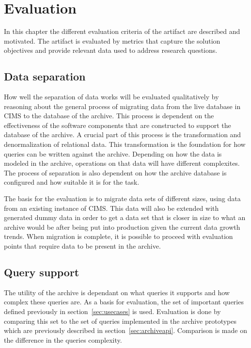 \chapter{Evaluation}
\label{chap:eval}

In this chapter the different evaluation criteria of the artifact are described and motivated. The artifact is evaluated by metrics that capture the solution objectives and provide relevant data used to address research questions.

\section{Data separation}
How well the separation of data works will be evaluated qualitatively by reasoning about the general process of migrating data from the live database in CIMS to the database of the archive. This process is dependent on the effectiveness of the software components that are constructed to support the database of the archive.
A crucial part of this process is the transformation and denormalization of relational data. This transformation is the foundation for how queries can be written against the archive. Depending on how the data is modeled in the archive, operations on that data will have different complexites. The process of separation is also dependent on how the archive database is configured and how suitable it is for the task. 

The basis for the evaluation is to migrate data sets of different sizes, using data from an existing instance of CIMS. This data will also be extended with generated dummy data in order to get a data set that is closer in size to what an archive would be after being put into production given the current data growth trends. When migration is complete, it is possible to proceed with evaluation points that require data to be present in the archive.  

\section{Query support}
The utility of the archive is dependant on what queries it supports and how complex these queries are. As a basis for evaluation, the set of important queries defined previously in section~\ref{sec:usecases} is used. Evaluation is done by comparing this set to the set of queries implemented in the archive prototypes which are previously described in section~\ref{sec:archiveapi}. Comparison is made on the difference in the queries complexity. 

